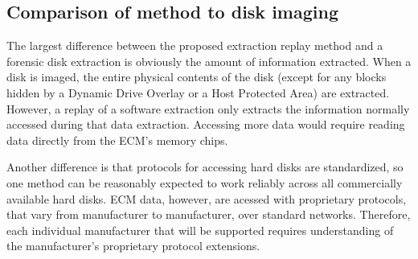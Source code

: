 \subsection{Comparison of method to disk imaging}

The largest difference between the proposed extraction replay method and a forensic disk extraction is obviously
the amount of information extracted. When a disk is imaged, the entire physical contents of the disk (except for
any blocks hidden by a Dynamic Drive Overlay or a Host Protected Area) are extracted. However, a replay of a
software extraction only extracts the information normally accessed during that data  extraction. Accessing more data
would require reading data directly from the ECM's memory chips.

Another difference is that protocols for accessing hard disks are standardized, so one method can be reasonably expected
to work reliably across all commercially available hard disks. ECM data, however, are acessed with proprietary protocols,
that vary from manufacturer to manufacturer, over standard networks. 
Therefore, each individual manufacturer that will be supported requires understanding of the  manufacturer's proprietary protocol extensions.


